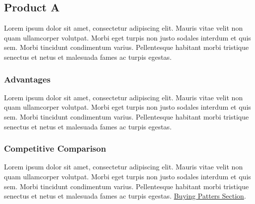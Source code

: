 \documentclass[11pt]{article}
\begin{document}
\subsection{Product A}
Lorem ipsum dolor sit amet, consectetur adipiscing elit. Mauris vitae velit 
non quam ullamcorper volutpat. Morbi eget turpis non justo sodales interdum 
et quis sem. Morbi tincidunt condimentum varius. Pellentesque habitant morbi 
tristique senectus et netus et malesuada fames ac turpis egestas.\newline

\subsubsection{Advantages}
Lorem ipsum dolor sit amet, consectetur adipiscing elit. Mauris vitae velit 
non quam ullamcorper volutpat. Morbi eget turpis non justo sodales interdum 
et quis sem. Morbi tincidunt condimentum varius. Pellentesque habitant morbi 
tristique senectus et netus et malesuada fames ac turpis egestas.\newline

\subsubsection{Competitive Comparison}
Lorem ipsum dolor sit amet, consectetur adipiscing elit. Mauris vitae velit 
non quam ullamcorper volutpat. Morbi eget turpis non justo sodales interdum 
et quis sem. Morbi tincidunt condimentum varius. Pellentesque habitant morbi 
tristique senectus et netus et malesuada fames ac turpis egestas.\newline
\hyperlink{competition_and_buying_patterns}{Buying Patters Section}.\newline\newline
\end{document}

